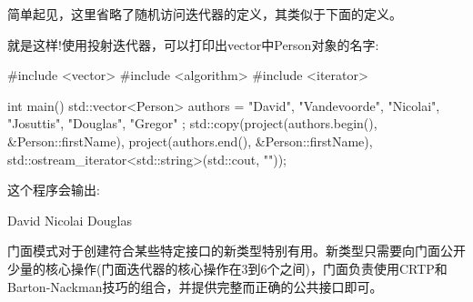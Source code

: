 简单起见，这里省略了随机访问迭代器的定义，其类似于下面的定义。

就是这样!使用投射迭代器，可以打印出vector中Person对象的名字:

\begin{cpp}
#include <vector>
#include <algorithm>
#include <iterator>

int main()
{
	std::vector<Person> authors = { {"David", "Vandevoorde"},
		{"Nicolai", "Josuttis"},
		{"Douglas", "Gregor"} };
	std::copy(project(authors.begin(), &Person::firstName),
	project(authors.end(), &Person::firstName),
	std::ostream_iterator<std::string>(std::cout, "\n"));
}
\end{cpp}

这个程序会输出:

\begin{shell}
David
Nicolai
Douglas
\end{shell}

门面模式对于创建符合某些特定接口的新类型特别有用。新类型只需要向门面公开少量的核心操作(门面迭代器的核心操作在3到6个之间)，门面负责使用CRTP和Barton-Nackman技巧的组合，并提供完整而正确的公共接口即可。












